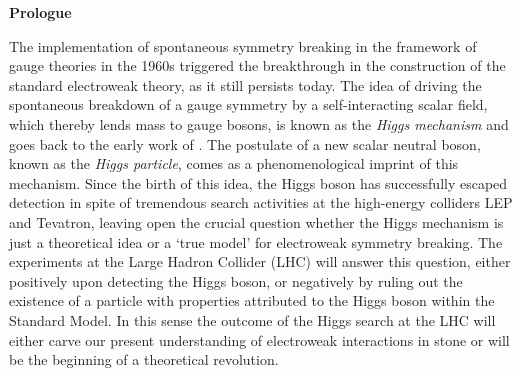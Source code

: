 \begin{center}
 {\bf Prologue}
\end{center}
\vspace{0.5cm}
The implementation of spontaneous symmetry breaking in the framework
of gauge theories in the 1960s triggered the breakthrough in the
construction of the standard electroweak theory, as it still persists
today. The idea of driving the spontaneous breakdown of a gauge
symmetry by a self-interacting scalar field, which thereby lends mass
to gauge bosons, is known as the {\it Higgs mechanism} and goes back
to the early work of 
{}. 
The postulate of a
new scalar neutral boson, known as the {\it Higgs particle}, comes as
a phenomenological imprint of this mechanism. Since the birth of this
idea, the Higgs boson has successfully escaped detection in spite
of tremendous search activities at the high-energy colliders
LEP and Tevatron, leaving open the crucial question whether the
Higgs mechanism is just a theoretical idea or a `true model'
for electroweak symmetry breaking. The experiments at the Large Hadron
Collider (LHC) will answer this question, either positively upon detecting 
the Higgs boson, or negatively by ruling out the existence of a particle with
properties attributed to the Higgs boson within the Standard Model.
In this sense the outcome of the Higgs search at the LHC will
either carve our present understanding of electroweak interactions
in stone or will be the beginning of a theoretical revolution.

